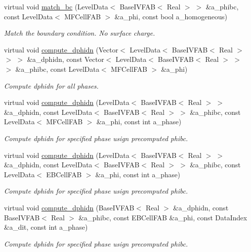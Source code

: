 \begin{DoxyCompactItemize}
virtual void \hyperlink{classjump__bc_ab3a108d35e2fbcb6ed4d97895379058c}{match\+\_\+bc} (Level\+Data$<$ Base\+I\+V\+F\+AB$<$ Real $>$ $>$ \&a\+\_\+phibc, const Level\+Data$<$ M\+F\+Cell\+F\+AB $>$ \&a\+\_\+phi, const bool a\+\_\+homogeneous)
\begin{DoxyCompactList}\small\item\em Match the boundary condition. No surface charge. \end{DoxyCompactList}\item 
virtual void \hyperlink{classjump__bc_a1159a798df1edc5da0c73ea02fce631b}{compute\+\_\+dphidn} (Vector$<$ Level\+Data$<$ Base\+I\+V\+F\+AB$<$ Real $>$ $>$ $>$ \&a\+\_\+dphidn, const Vector$<$ Level\+Data$<$ Base\+I\+V\+F\+AB$<$ Real $>$ $>$ $>$ \&a\+\_\+phibc, const Level\+Data$<$ M\+F\+Cell\+F\+AB $>$ \&a\+\_\+phi)
\begin{DoxyCompactList}\small\item\em Compute dphidn for all phases. \end{DoxyCompactList}\item 
virtual void \hyperlink{classjump__bc_ac98c831acbe5d72377fa8353e3ab547b}{compute\+\_\+dphidn} (Level\+Data$<$ Base\+I\+V\+F\+AB$<$ Real $>$ $>$ \&a\+\_\+dphidn, const Level\+Data$<$ Base\+I\+V\+F\+AB$<$ Real $>$ $>$ \&a\+\_\+phibc, const Level\+Data$<$ M\+F\+Cell\+F\+AB $>$ \&a\+\_\+phi, const int a\+\_\+phase)
\begin{DoxyCompactList}\small\item\em Compute dphidn for specified phase usign precomputed phibc. \end{DoxyCompactList}\item 
virtual void \hyperlink{classjump__bc_a5991cedb8adf3767d56f88bbab400135}{compute\+\_\+dphidn} (Level\+Data$<$ Base\+I\+V\+F\+AB$<$ Real $>$ $>$ \&a\+\_\+dphidn, const Level\+Data$<$ Base\+I\+V\+F\+AB$<$ Real $>$ $>$ \&a\+\_\+phibc, const Level\+Data$<$ E\+B\+Cell\+F\+AB $>$ \&a\+\_\+phi, const int a\+\_\+phase)
\begin{DoxyCompactList}\small\item\em Compute dphidn for specified phase usign precomputed phibc. \end{DoxyCompactList}\item 
virtual void \hyperlink{classjump__bc_a5ce23174ab5c6bd22863ffefbbdd0c57}{compute\+\_\+dphidn} (Base\+I\+V\+F\+AB$<$ Real $>$ \&a\+\_\+dphidn, const Base\+I\+V\+F\+AB$<$ Real $>$ \&a\+\_\+phibc, const E\+B\+Cell\+F\+AB \&a\+\_\+phi, const Data\+Index \&a\+\_\+dit, const int a\+\_\+phase)
\begin{DoxyCompactList}\small\item\em Compute dphidn for specified phase usign precomputed phibc. \end{DoxyCompactList}\item 

\end{DoxyCompactItemize}
